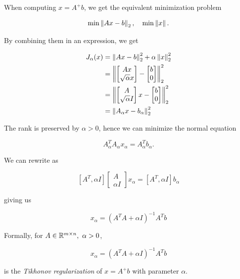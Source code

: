 When computing \(x = A^+ b\), we get the equivalent minimization problem 

\[
    \min \left\| Ax - b \right\|_2, \quad \min \left\| x \right\|.
\]

By combining them in an expression, we get 

\begin{align*}
    J_{\alpha}(x) &= \left\| Ax - b \right\|_2^2 + \alpha \left\| x \right\|_2^2 \\ 
    &= \left\| 
        \begin{bmatrix} 
            Ax \\ 
            \sqrt{\alpha}x
        \end{bmatrix}
        - 
        \begin{bmatrix}
            b \\ 
            0
        \end{bmatrix}
         \right\|_2^2 \\ 
    &= \left\| 
        \begin{bmatrix} 
            A \\ 
            \sqrt{\alpha}I
        \end{bmatrix}x
        - 
        \begin{bmatrix}
            b \\ 
            0
        \end{bmatrix}
         \right\|_2^2 \\ 
    &= \left\| A_{\alpha}x - b_{\alpha} \right\|_2^2
\end{align*}

The rank is preserved by \(\alpha > 0\), hence we can minimize the normal equation

\[
    A_{\alpha}^T A_{\alpha} x_{\alpha} = A_{\alpha}^T b_{\alpha}.
\]

We can rewrite as

\[
    [A^T, \alpha I]
    \begin{bmatrix}
        A \\ 
        \alpha I
    \end{bmatrix}
    x_{\alpha}
    = [A^T, \alpha I] b_{\alpha}
\]

giving us 

\[
    x_{\alpha} = (A^T A + \alpha I)^{-1} A^T b
\]

Formally, for \(A \in \R^{m \times n},\ \alpha > 0\), 

\[
    x_{\alpha} = (A^T A + \alpha I)^{-1} A^T b
\]

is the \emph{Tikhonov regularization} of \(x = A^+ b\) with parameter \(\alpha\).